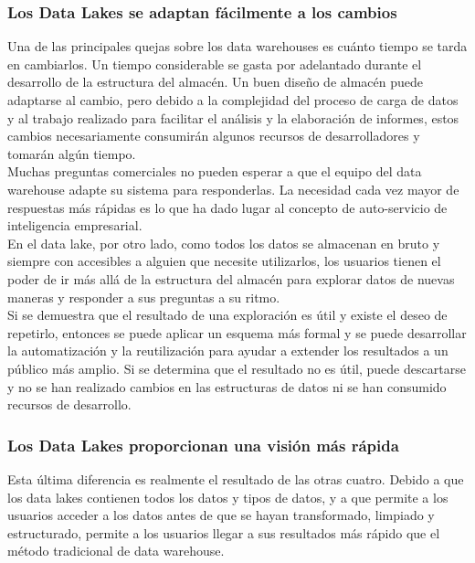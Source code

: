 \documentclass[preprint,12pt]{elsarticle}
\begin{document}
\subsubsection{Los Data Lakes se adaptan fácilmente a los cambios}

Una de las principales quejas sobre los data warehouses es cuánto tiempo se tarda en cambiarlos. Un tiempo considerable se gasta por adelantado durante el desarrollo de la estructura del almacén. Un buen diseño de almacén puede adaptarse al cambio, pero debido a la complejidad del proceso de carga de datos y al trabajo realizado para facilitar el análisis y la elaboración de informes, estos cambios necesariamente consumirán algunos recursos de desarrolladores y tomarán algún tiempo.\\

Muchas preguntas comerciales no pueden esperar a que el equipo del data warehouse adapte su sistema para responderlas. La necesidad cada vez mayor de respuestas más rápidas es lo que ha dado lugar al concepto de auto-servicio de inteligencia empresarial.\\

En el data lake, por otro lado, como todos los datos se almacenan en bruto y siempre con accesibles a alguien que necesite utilizarlos, los usuarios tienen el poder de ir más allá de la estructura del almacén para explorar datos de nuevas maneras y responder a sus preguntas a su ritmo.\\

Si se demuestra que el resultado de una exploración es útil y existe el deseo de repetirlo, entonces se puede aplicar un esquema más formal y se puede desarrollar la automatización y la reutilización para ayudar a extender los resultados a un público más amplio. Si se determina que el resultado no es útil, puede descartarse y no se han realizado cambios en las estructuras de datos ni se han consumido recursos de desarrollo.\\

\subsubsection{ Los Data Lakes proporcionan una visión más rápida}

Esta última diferencia es realmente el resultado de las otras cuatro. Debido a que los data lakes contienen todos los datos y tipos de datos, y a que permite a los usuarios acceder a los datos antes de que se hayan transformado, limpiado y estructurado, permite a los usuarios llegar a sus resultados más rápido que el método tradicional de data warehouse.\\
\end{document}

